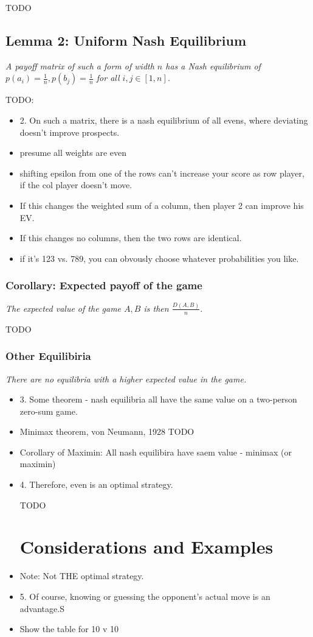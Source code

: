 \documentclass[11pt, oneside]{article} 	%
\begin{document}
TODO

\subsection{Lemma 2: Uniform Nash Equilibrium}

\emph{ A payoff matrix of such a form of width $n$ has a Nash equilibrium of $p(a_i) = \frac{1}{n}, p(b_j) = \frac{1}{n}$ for all $i, j \in [1,n]$.}

TODO: 
\begin{itemize}
\item 2. On such a matrix, there is a nash equilibrium of all evens, where deviating doesn't improve prospects.
\item presume all weights are even
\item shifting epsilon from one of the rows can't increase your score as row player, if the col player doesn't move.
\item If this changes the weighted sum of a column, then player 2 can improve his EV.
\item If this changes no columns, then the two rows are identical.
\item if it's 123 vs.  789, you can obvously choose whatever probabilities you like.
\end{itemize}

\subsubsection{Corollary: Expected payoff of the game}

\emph{ The expected value of the game $A, B$ is then $\frac{D(A,B)}{n}$.}

TODO

\subsubsection{Other Equilibiria}

\emph{There are no equilibria with a higher expected value in the game.}
\begin{itemize}
\item 3. Some theorem - nash equilibria all have the same value on a two-person zero-sum game.
\item Minimax theorem, von Neumann, 1928 TODO    
\item Corollary of Maximin: All nash equilibira have saem value - minimax (or maximin)
\item 4. Therefore, even is an optimal strategy.

TODO




\section{Considerations and Examples}
\item Note: Not THE optimal strategy.
\item  5. Of course, knowing or guessing the opponent's actual move is an advantage.S
\item Show the table for 10 v 10
\end{itemize}
\end{document}
